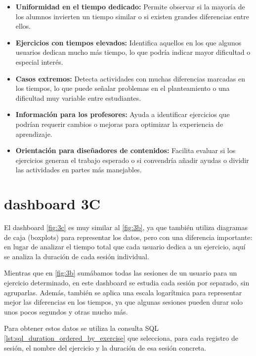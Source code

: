 \documentclass[a4paper, 12pt]{book}
\begin{document}
\begin{itemize}
  \item \textbf{Uniformidad en el tiempo dedicado:} Permite observar si la mayoría de los alumnos invierten un tiempo similar o si existen grandes diferencias entre ellos.

  \item \textbf{Ejercicios con tiempos elevados:} Identifica aquellos en los que algunos usuarios dedican mucho más tiempo, lo que podría indicar mayor dificultad o especial interés.

  \item \textbf{Casos extremos:} Detecta actividades con muchas diferencias marcadas en los tiempos, lo que puede señalar problemas en el planteamiento o una dificultad muy variable entre estudiantes.

  \item \textbf{Información para los profesores:} Ayuda a identificar ejercicios que podrían requerir cambios o mejoras para optimizar la experiencia de aprendizaje.

  \item \textbf{Orientación para diseñadores de contenidos:} Facilita evaluar si los ejercicios generan el trabajo esperado o si convendría añadir ayudas o dividir las actividades en partes más manejables.
\end{itemize}

\section{dashboard 3C}

El dashboard \ref{fig:3c} es muy similar al \ref{fig:3b}, ya que también utiliza diagramas de caja (boxplots) para representar los datos, pero con una diferencia importante: en lugar de analizar el tiempo total que cada usuario dedica a un ejercicio, aquí se analiza la duración de cada sesión individual.

Mientras que en \ref{fig:3b} sumábamos todas las sesiones de un usuario para un ejercicio determinado, en este dashboard se estudia cada sesión por separado, sin agruparlas. Además, también se aplica una escala logarítmica para representar mejor las diferencias en los tiempos, ya que algunas sesiones pueden durar solo unos pocos segundos y otras mucho más.

Para obtener estos datos se utiliza la consulta SQL \ref{lst:sql_duration_ordered_by_exercise} que selecciona, para cada registro de sesión, el nombre del ejercicio y la duración de esa sesión concreta.
\end{document}
